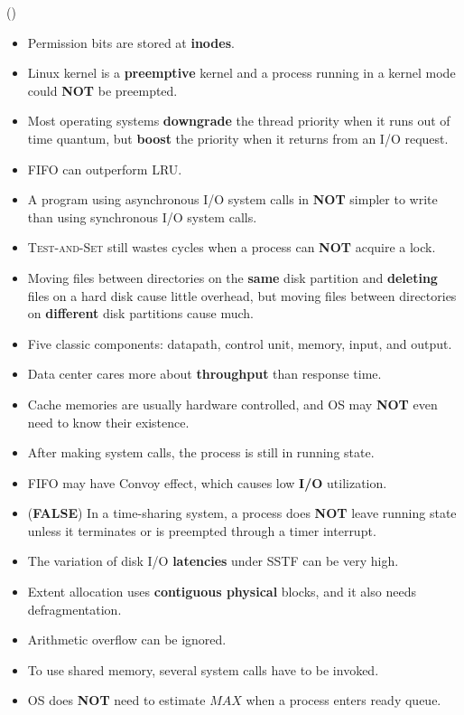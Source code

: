 \begin{theorem}{()}
\begin{itemize}
        \item Permission bits are stored at \textbf{inodes}.
        \item Linux kernel is a \textbf{preemptive} kernel and a process running in a kernel mode could \textbf{NOT} be preempted.
        \item Most operating systems \textbf{downgrade} the thread priority when it runs out of time quantum, but \textbf{boost} the priority when it returns from an I/O request.
        \item FIFO can outperform LRU.
        \item A program using asynchronous I/O system calls in \textbf{NOT} simpler to write than using synchronous I/O system calls.
        \item \textsc{Test-and-Set} still wastes cycles when a process can \textbf{NOT} acquire a lock. 
        \item Moving files between directories on the \textbf{same} disk partition and \textbf{deleting} files on a hard disk cause little overhead, but moving files between directories on \textbf{different} disk partitions cause much.
        \item Five classic components: datapath, control unit, memory, input, and output.
        \item Data center cares more about \textbf{throughput} than response time.
        \item Cache memories are usually hardware controlled, and OS may \textbf{NOT} even need to know their existence.
        \item After making system calls, the process is still in running state.
        \item FIFO may have Convoy effect, which causes low \textbf{I/O} utilization.
        \item (\textbf{FALSE}) In a time-sharing system, a process does \textbf{NOT} leave running state unless it terminates or is preempted through a timer interrupt. 
        \item The variation of disk I/O \textbf{latencies} under SSTF can be very high.
        \item Extent allocation uses \textbf{contiguous physical} blocks, and it also needs defragmentation.
        \item Arithmetic overflow can be ignored.
        \item To use shared memory, several system calls have to be invoked.
        \item OS does \textbf{NOT} need to estimate $MAX$ when a process enters ready queue.

\end{itemize}
\end{theorem}

